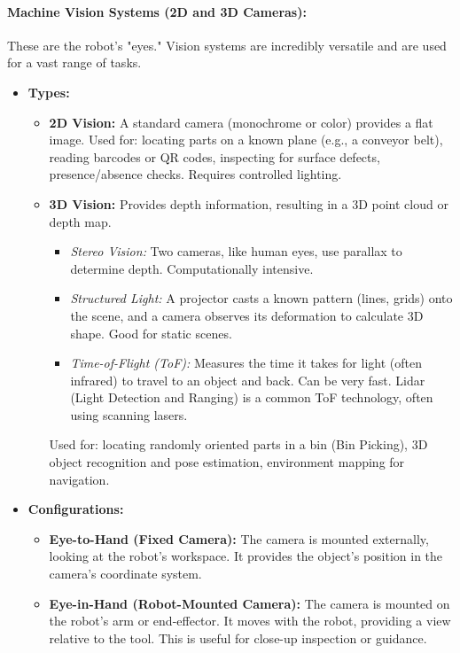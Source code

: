     \paragraph{\textbf{Machine Vision Systems (2D and 3D Cameras):}}
    These are the robot's "eyes." Vision systems are incredibly versatile and are used for a vast range of tasks.
    \begin{itemize}
        \item \textbf{Types:}
            \begin{itemize}
                \item \textbf{2D Vision:} A standard camera (monochrome or color) provides a flat image. Used for: locating parts on a known plane (e.g., a conveyor belt), reading barcodes or QR codes, inspecting for surface defects, presence/absence checks. Requires controlled lighting.
                \item \textbf{3D Vision:} Provides depth information, resulting in a 3D point cloud or depth map.
                    \begin{itemize}
                        \item \textit{Stereo Vision:} Two cameras, like human eyes, use parallax to determine depth. Computationally intensive.
                        \item \textit{Structured Light:} A projector casts a known pattern (lines, grids) onto the scene, and a camera observes its deformation to calculate 3D shape. Good for static scenes.
                        \item \textit{Time-of-Flight (ToF):} Measures the time it takes for light (often infrared) to travel to an object and back. Can be very fast. Lidar (Light Detection and Ranging) is a common ToF technology, often using scanning lasers.
                    \end{itemize}
                    Used for: locating randomly oriented parts in a bin (Bin Picking), 3D object recognition and pose estimation, environment mapping for navigation.
            \end{itemize}
        \item \textbf{Configurations:}
            \begin{itemize}
                \item \textbf{Eye-to-Hand (Fixed Camera):} The camera is mounted externally, looking at the robot's workspace. It provides the object's position in the camera's coordinate system.
                \item \textbf{Eye-in-Hand (Robot-Mounted Camera):} The camera is mounted on the robot's arm or end-effector. It moves with the robot, providing a view relative to the tool. This is useful for close-up inspection or guidance.

\end{itemize}
\end{itemize}
